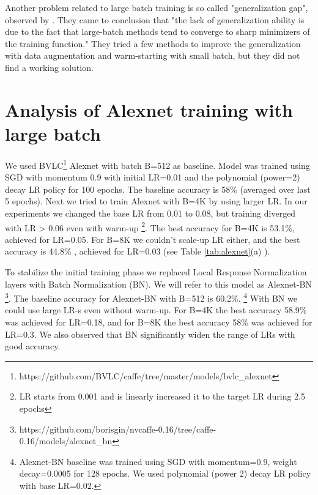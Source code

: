 \documentclass{article} %
\begin{document}
Another problem related to large batch training is so called "generalization gap", observed by \cite{keskar2016large}. They came to conclusion that "the lack of generalization ability is due to the fact that large-batch methods tend to converge to sharp minimizers of the training function." They tried a few methods to improve the generalization with data augmentation and warm-starting with small batch, but they did not find a working solution.

\section{Analysis of Alexnet training with large batch}
\label{sec:Alexnet}

We used  BVLC\footnote{https://github.com/BVLC/caffe/tree/master/models/bvlc\_alexnet} Alexnet with batch B=512 as baseline. Model was trained using SGD with momentum 0.9 with initial LR=0.01 and the polynomial (power=2) decay LR policy for 100 epochs. The baseline accuracy is 58\% (averaged over last 5 epochs). 
Next we tried to train Alexnet with B=4K by using larger LR. In our experiments we changed the base LR from 0.01 to 0.08, but training diverged with LR > 0.06  even with warm-up \footnote{LR  starts from 0.001 and is linearly increased it to the target LR during 2.5 epochs}. The best accuracy for B=4K is 53.1\%, achieved for LR=0.05. For B=8K we couldn't scale-up LR either, and the best accuracy is 44.8\% , achieved for LR=0.03 (see Table \ref{tab:alexnet}(a) ).

To stabilize the initial training phase we replaced Local Response Normalization layers with Batch Normalization (BN). We will refer to this  model as Alexnet-BN 
\footnote{ https://github.com/borisgin/nvcaffe-0.16/tree/caffe-0.16/models/alexnet\_bn}. The baseline accuracy for Alexnet-BN with B=512 is 60.2\%. 
\footnote{
Alexnet-BN baseline was trained using SGD with  momentum=0.9, weight decay=0.0005 for 128 epochs. We used polynomial (power 2) decay LR policy with base LR=0.02. }
With BN we could use large LR-s even without warm-up.  For B=4K the best accuracy 58.9\% was achieved for LR=0.18,  and for B=8K the best accuracy 58\%  was achieved  for LR=0.3. We also observed that BN significantly widen the range of LRs with good accuracy.
\end{document}

